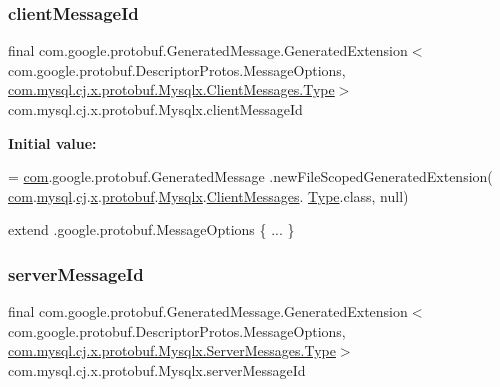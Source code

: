 \subsubsection{\texorpdfstring{client\+Message\+Id}{clientMessageId}}
{\footnotesize\ttfamily final com.\+google.\+protobuf.\+Generated\+Message.\+Generated\+Extension$<$ com.\+google.\+protobuf.\+Descriptor\+Protos.\+Message\+Options, \mbox{\hyperlink{enumcom_1_1mysql_1_1cj_1_1x_1_1protobuf_1_1_mysqlx_1_1_client_messages_1_1_type}{com.\+mysql.\+cj.\+x.\+protobuf.\+Mysqlx.\+Client\+Messages.\+Type}}$>$ com.\+mysql.\+cj.\+x.\+protobuf.\+Mysqlx.\+client\+Message\+Id\hspace{0.3cm}{\ttfamily [static]}}

{\bfseries Initial value\+:}
\begin{DoxyCode}
= \mbox{\hyperlink{namespacecom}{com}}.google.protobuf.GeneratedMessage
          .newFileScopedGeneratedExtension(
        \mbox{\hyperlink{namespacecom}{com}}.\mbox{\hyperlink{namespacecom_1_1mysql}{mysql}}.\mbox{\hyperlink{namespacecom_1_1mysql_1_1cj}{cj}}.\mbox{\hyperlink{namespacecom_1_1mysql_1_1cj_1_1x}{x}}.\mbox{\hyperlink{namespacecom_1_1mysql_1_1cj_1_1x_1_1protobuf}{protobuf}}.\mbox{\hyperlink{classcom_1_1mysql_1_1cj_1_1x_1_1protobuf_1_1_mysqlx}{Mysqlx}}.\mbox{\hyperlink{classcom_1_1mysql_1_1cj_1_1x_1_1protobuf_1_1_mysqlx_1_1_client_messages}{ClientMessages}}.
      \mbox{\hyperlink{enumcom_1_1mysql_1_1cj_1_1x_1_1protobuf_1_1_mysqlx_1_1_client_messages_1_1_type}{Type}}.class,
        null)
\end{DoxyCode}
{\ttfamily extend .google.\+protobuf.\+Message\+Options \{ ... \}} \mbox{\label{classcom_1_1mysql_1_1cj_1_1x_1_1protobuf_1_1_mysqlx_aa80c35e06003c6b88c27f1dc6284db4b}} 
\subsubsection{\texorpdfstring{server\+Message\+Id}{serverMessageId}}
{\footnotesize\ttfamily final com.\+google.\+protobuf.\+Generated\+Message.\+Generated\+Extension$<$ com.\+google.\+protobuf.\+Descriptor\+Protos.\+Message\+Options, \mbox{\hyperlink{enumcom_1_1mysql_1_1cj_1_1x_1_1protobuf_1_1_mysqlx_1_1_server_messages_1_1_type}{com.\+mysql.\+cj.\+x.\+protobuf.\+Mysqlx.\+Server\+Messages.\+Type}}$>$ com.\+mysql.\+cj.\+x.\+protobuf.\+Mysqlx.\+server\+Message\+Id\hspace{0.3cm}{\ttfamily [static]}}

